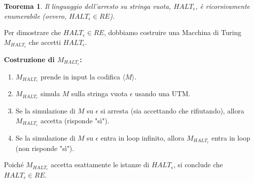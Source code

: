 \documentclass[a4paper]{article}
\makeatletter
\newtheorem{theorem}{Teorema}[section] %
\renewenvironment{proof}[1][\proofname]{\par
  \pushQED{\qed}%
  \normalfont \topsep6\p@\@plus6\p@\relax
  \trivlist
  \item[\hskip\labelsep
        \bfseries
    #1\@addpunct{.}]\ignorespaces
}{%
  \popQED\endtrivlist\@endpefalse
}
\makeatother
\begin{document}
\begin{theorem}
Il linguaggio dell'arresto su stringa vuota, $HALT_\epsilon$, è ricorsivamente enumerabile (ovvero, $HALT_\epsilon \in RE$).
\end{theorem}
\begin{proof}
Per dimostrare che $HALT_\epsilon \in RE$, dobbiamo costruire una Macchina di Turing $M_{HALT_\epsilon}$ che accetti $HALT_\epsilon$.

\textbf{Costruzione di $M_{HALT_\epsilon}$:}
\begin{enumerate}
    \item $M_{HALT_\epsilon}$ prende in input la codifica $\langle M \rangle$.
    \item $M_{HALT_\epsilon}$ simula $M$ sulla stringa vuota $\epsilon$ usando una UTM.
    \item Se la simulazione di $M$ su $\epsilon$ si arresta (sia accettando che rifiutando), allora $M_{HALT_\epsilon}$ accetta (risponde "sì").
    \item Se la simulazione di $M$ su $\epsilon$ entra in loop infinito, allora $M_{HALT_\epsilon}$ entra in loop (non risponde "sì").
\end{enumerate}
Poiché $M_{HALT_\epsilon}$ accetta esattamente le istanze di $HALT_\epsilon$, si conclude che $HALT_\epsilon \in RE$.
\end{proof}
\end{document}
